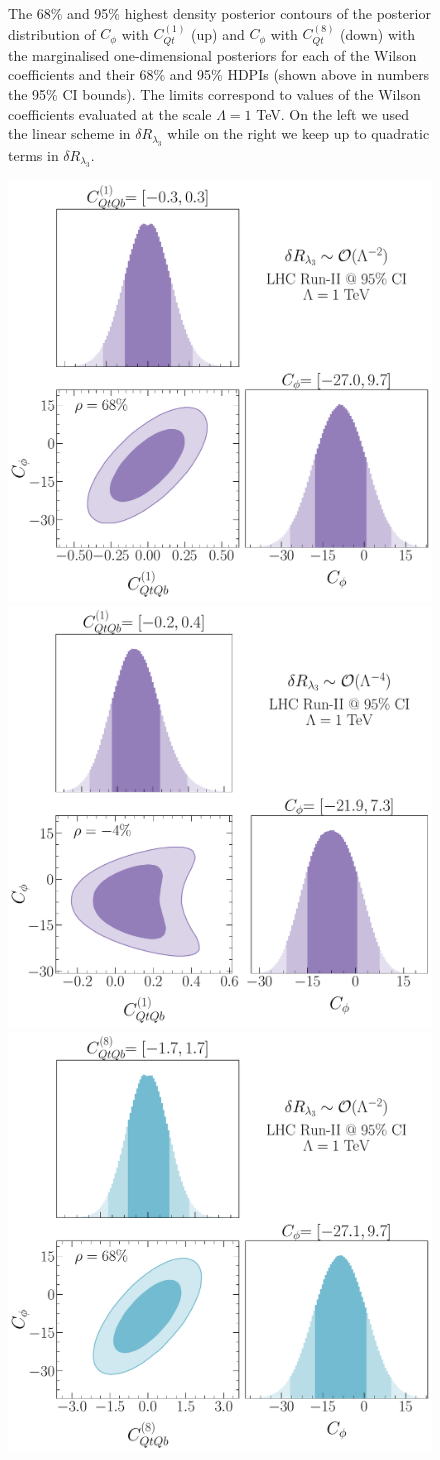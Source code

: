 \begin{figure}[h!]
\begin{center}
	\end{center}
	\caption{The 68\% and 95\% highest density posterior contours of the posterior distribution of $C_\phi$ with $C_{Qt}^{(1)}$ (up) and $C_\phi$ with $C_{Qt}^{(8)}$ (down) with the marginalised one-dimensional posteriors for each of the Wilson coefficients and their 68\% and 95\% HDPIs (shown above in numbers the 95\% CI bounds). 
		The limits correspond to values of the Wilson coefficients evaluated at the scale $\Lambda=1$ TeV.
		On the left we used the linear scheme in $\delta R_{\lambda_3}$ while on the right we keep up to quadratic terms in   $\delta R_{\lambda_3}$. \label{2param-cqt} } 
\end{figure}

\begin{figure}[h!]
	\begin{center}
		\includegraphics[width=0.45\linewidth]{fig/Cqtqb1_LHC_RunII_linearl3_rge}
		\includegraphics[width=0.45\linewidth]{fig/Cqtqb1_LHC_RunII_quadl3_rge} \\ 
		\includegraphics[width=0.45\linewidth]{fig/Cqtqb8_LHC_RunII_linearl3_rge}

\end{center}
\end{figure}
